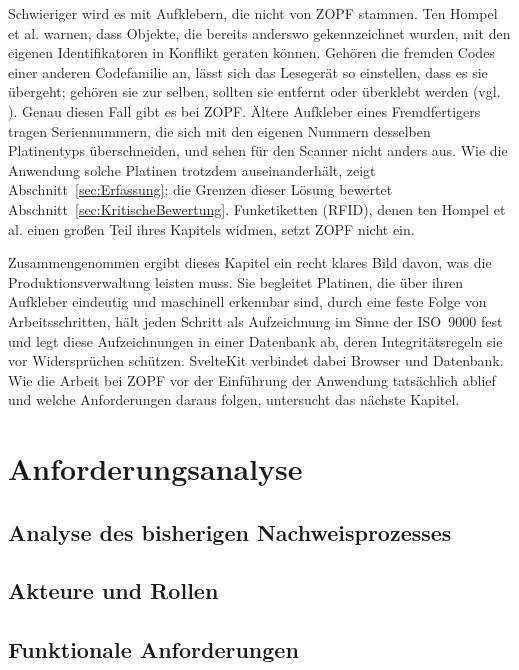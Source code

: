 Schwieriger wird es mit Aufklebern, die nicht von ZOPF stammen. Ten Hompel et al.
warnen, dass Objekte, die bereits anderswo gekennzeichnet wurden, mit den eigenen
Identifikatoren in Konflikt geraten können. Gehören die fremden Codes einer
anderen Codefamilie an, lässt sich das Lesegerät so einstellen, dass es sie
übergeht; gehören sie zur selben, sollten sie entfernt oder überklebt werden (vgl.
\cite[S.~102]{tenhompelIdentifikationssystemeUndAutomatisierung2008}). Genau diesen Fall gibt es bei
ZOPF. Ältere Aufkleber eines Fremdfertigers tragen Seriennummern, die sich mit
den eigenen Nummern desselben Platinentyps überschneiden, und sehen für den
Scanner nicht anders aus. Wie die Anwendung solche Platinen trotzdem
auseinanderhält, zeigt Abschnitt~\ref{sec:Erfassung}; die Grenzen dieser Lösung
bewertet Abschnitt~\ref{sec:KritischeBewertung}. Funketiketten (RFID), denen
ten Hompel et al. einen großen Teil ihres Kapitels widmen, setzt ZOPF nicht ein.

Zusammengenommen ergibt dieses Kapitel ein recht klares Bild davon, was die
Produktionsverwaltung leisten muss. Sie begleitet Platinen, die über ihren
Aufkleber eindeutig und maschinell erkennbar sind, durch eine feste Folge von
Arbeitsschritten, hält jeden Schritt als Aufzeichnung im Sinne der ISO~9000 fest
und legt diese Aufzeichnungen in einer Datenbank ab, deren Integritätsregeln sie
vor Widersprüchen schützen. SvelteKit verbindet dabei Browser und Datenbank.
Wie die Arbeit bei ZOPF vor der Einführung der Anwendung tatsächlich ablief und
welche Anforderungen daraus folgen, untersucht das nächste Kapitel.


\chapter{Anforderungsanalyse}
\label{sec:Anforderungsanalyse}

\section{Analyse des bisherigen Nachweisprozesses}
\label{sec:IstAnalyse}

\section{Akteure und Rollen}
\label{sec:Akteure}

\section{Funktionale Anforderungen}
\label{sec:FunktionaleAnforderungen}


